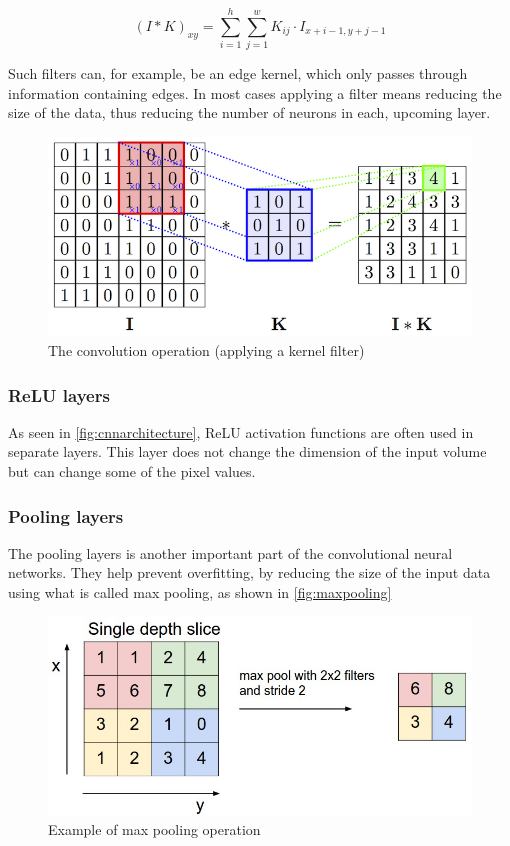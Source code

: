 \begin{equation}\label{eq:convop}
(I*K)_{xy} = \sum_{i=1}^{h}\sum_{j=1}^{w}K_{ij} \cdot I_{x+i-1,y+j-1}
\end{equation}

Such filters can, for example, be an edge kernel, which only passes through information containing edges. In most cases applying a filter means reducing the size of the data, thus reducing the number of neurons in each, upcoming layer.

\begin{figure}[!h]
	\centering
	\includegraphics[scale=1.5]{fig/kernel_filter.png}
	\caption{The convolution operation (applying a kernel filter) \cite{Cambridge2017}}
	\label{fig:cnnarchitecture}
\end{figure}

\subsubsection{ReLU layers}
As seen in \autoref{fig:cnnarchitecture}, ReLU activation functions are often used in separate layers. This layer does not change the dimension of the input volume but can change some of the pixel values.

\subsubsection{Pooling layers}\label{section:pooling}
The pooling layers is another important part of the convolutional neural networks. They help prevent overfitting, by reducing the size of the input data using what is called max pooling, as shown in \autoref{fig:maxpooling}
\begin{figure}[!h]
	\centering
	\includegraphics[scale=0.5]{fig/pooling_layer.jpeg}
	\caption{Example of max pooling operation \cite{Karpathy2017}}
	\label{fig:maxpooling}
\end{figure}

